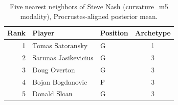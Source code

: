 \begin{table}[htbp]
  \centering\small
  \begin{tabular}{rllc}
    \toprule
    Rank & Player & Position & Archetype \\
    \midrule
    1 & Tomas Satoransky & G & 1 \\
    2 & Sarunas Jasikevicius & G & 3 \\
    3 & Doug Overton & G & 3 \\
    4 & Bojan Bogdanovic & F & 3 \\
    5 & Donald Sloan & G & 3 \\
    \bottomrule
  \end{tabular}
  \caption{Five nearest neighbors of Steve Nash (curvature_m5 modality), Procrustes-aligned posterior mean.}
  \label{tab:Steve_Nash_neighbors_curvature_m5}
\end{table}

